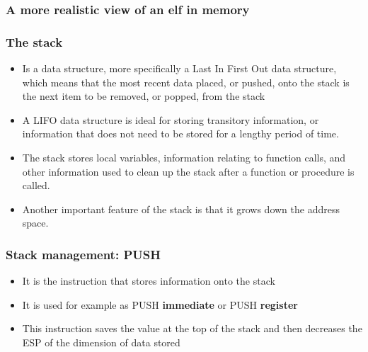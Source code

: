 \documentclass[]{beamer}
\begin{document}
      \begin{frame}
         \frametitle{A more realistic view of an elf in memory}
            \begin{figure}
            \end{figure}
      \end{frame}
      \begin{frame}
      \frametitle{The stack}
      \begin{itemize}
        \item{Is a data structure, more specifically a Last In First Out data structure, which means that the most recent data placed, or pushed, onto the stack is the next item to be removed, or popped, from the stack}
        \item{A LIFO data structure is ideal for storing transitory information, or information that does not need to be stored for a lengthy period of time.}
        \item{The stack stores local variables, information relating to function calls, and other information used to clean up the stack after a function or procedure is called.}
        \item{Another important feature of the stack is that it grows down the address space. }
      \end{itemize}
      \end{frame}
      \begin{frame}
      \frametitle{Stack management: PUSH}
        \begin{itemize}
            \item{It is the instruction that stores information onto the stack}
            \item{It is used for example as  PUSH {\bf immediate} or PUSH {\bf register} }
            \item{This instruction saves the value at the top of the stack and then decreases the ESP of the dimension of data stored}
        \end{itemize}
      \end{frame}
\end{document}
